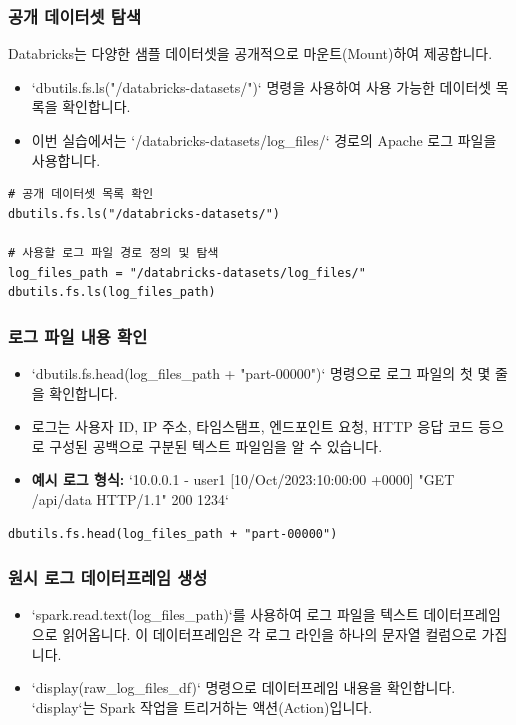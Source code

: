 \documentclass[11pt,a4paper]{article}
\begin{document}
\subsubsection{공개 데이터셋 탐색}
Databricks는 다양한 샘플 데이터셋을 공개적으로 마운트(Mount)하여 제공합니다.
\begin{itemize}
    \item `dbutils.fs.ls("/databricks-datasets/")` 명령을 사용하여 사용 가능한 데이터셋 목록을 확인합니다.
    \item 이번 실습에서는 `/databricks-datasets/log_files/` 경로의 Apache 로그 파일을 사용합니다.
\end{itemize}

\begin{lstlisting}
# 공개 데이터셋 목록 확인
dbutils.fs.ls("/databricks-datasets/")

# 사용할 로그 파일 경로 정의 및 탐색
log_files_path = "/databricks-datasets/log_files/"
dbutils.fs.ls(log_files_path)
\end{lstlisting}

\subsubsection{로그 파일 내용 확인}
\begin{itemize}
    \item `dbutils.fs.head(log_files_path + "part-00000")` 명령으로 로그 파일의 첫 몇 줄을 확인합니다.
    \item 로그는 사용자 ID, IP 주소, 타임스탬프, 엔드포인트 요청, HTTP 응답 코드 등으로 구성된 공백으로 구분된 텍스트 파일임을 알 수 있습니다.
    \item \textbf{예시 로그 형식:} `10.0.0.1 - user1 [10/Oct/2023:10:00:00 +0000] "GET /api/data HTTP/1.1" 200 1234`
\end{itemize}

\begin{lstlisting}
dbutils.fs.head(log_files_path + "part-00000")
\end{lstlisting}

\subsubsection{원시 로그 데이터프레임 생성}
\begin{itemize}
    \item `spark.read.text(log_files_path)`를 사용하여 로그 파일을 텍스트 데이터프레임으로 읽어옵니다. 이 데이터프레임은 각 로그 라인을 하나의 문자열 컬럼으로 가집니다.
    \item `display(raw_log_files_df)` 명령으로 데이터프레임 내용을 확인합니다. `display`는 Spark 작업을 트리거하는 액션(Action)입니다.
\end{itemize}
\end{document}
